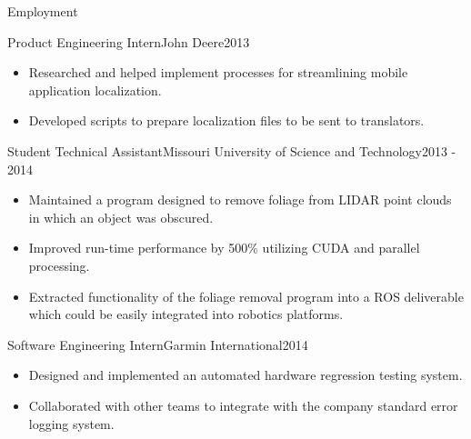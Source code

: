\documentclass[]{mcdowellcv}
\begin{document}
\begin{cvsection}{Employment}
\begin{johndeere}
        \begin{cvsubsection}{Product Engineering Intern}{John Deere}{2013}
            \begin{itemize}
                \item Researched and helped implement processes for streamlining mobile application localization.
                \item Developed scripts to prepare localization files to be sent to translators.
            \end{itemize}
        \end{cvsubsection}
\end{johndeere}
        
\begin{rockmech}
        \begin{cvsubsection}[2]{Student Technical Assistant}{Missouri University of Science and Technology}{2013 - 2014}        
            \begin{itemize}
                \item Maintained a program designed to remove foliage from LIDAR point clouds in which an object was obscured.
                \item Improved run-time performance by 500\% utilizing CUDA and parallel processing.
                \item Extracted functionality of the foliage removal program into a ROS deliverable which could be easily integrated into robotics platforms.
            \end{itemize}
        \end{cvsubsection}
\end{rockmech}
        
\begin{garmin}
        \begin{cvsubsection}{Software Engineering Intern}{Garmin International}{2014}   
            \begin{itemize}
                \item Designed and implemented an automated hardware regression testing system.
                \item Collaborated with other teams to integrate with the company standard error logging system.
            \end{itemize}
        \end{cvsubsection}
\end{garmin}


\end{cvsection}
\end{document}
